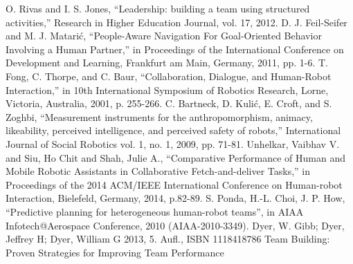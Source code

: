 \documentclass{acm_proc_article-sp}
\begin{document}
\begin{thebibliography}{}
 O. Rivas and I. S. Jones, ``Leadership: building a team using structured activities,'' Research in Higher Education Journal, vol. 17, 2012.
 D. J. Feil-Seifer and M. J. Matari\'{c}, ``People-Aware Navigation For Goal-Oriented Behavior Involving a Human Partner,'' in Proceedings of the International Conference on Development and Learning, Frankfurt am Main, Germany, 2011, pp. 1-6.
 T. Fong, C. Thorpe, and C. Baur, ``Collaboration, Dialogue, and Human-Robot Interaction,'' in 10th International Symposium of Robotics Research, Lorne, Victoria, Australia, 2001, p. 255-266.
 C. Bartneck, D. Kuli\'{c}, E. Croft, and S. Zoghbi, ``Measurement instruments for the anthropomorphism, animacy, likeability, perceived intelligence, and perceived safety of robots,'' International Journal of Social Robotics vol. 1, no. 1, 2009, pp. 71-81.
 Unhelkar, Vaibhav V. and Siu, Ho Chit and Shah, Julie A., ``Comparative Performance of Human and Mobile Robotic Assistants in Collaborative Fetch-and-deliver Tasks,'' in Proceedings of the 2014 ACM/IEEE International Conference on Human-robot Interaction, Bielefeld, Germany, 2014, p.82-89.
 S. Ponda, H.-L. Choi, J. P. How, ``Predictive planning for heterogeneous human-robot teams'', in AIAA Infotech@Aerospace Conference, 2010 (AIAA-2010-3349).
 Dyer, W. Gibb; Dyer, Jeffrey H; Dyer, William G 2013, 5. Aufl., ISBN 1118418786 Team Building: Proven Strategies for Improving Team Performance
\end{thebibliography}

\balancecolumns
\end{document}
